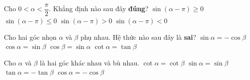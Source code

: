 \begin{ex}%
	 Cho $0< \alpha < \dfrac{\pi}{2}$. Khẳng định nào sau đây \textbf{đúng}?
	\choice 
		{$\sin \left(\alpha-\pi \right)\ge 0$} 
		{$\sin \left(\alpha-\pi \right)\le 0$} 
		{$\sin \left(\alpha-\pi  \right) > 0$}
		 {\True $\sin \left(\alpha-\pi \right) < 0$}
\end{ex}

\begin{ex}%
	Cho hai góc nhọn $\alpha$ và $\beta$ phụ nhau.  Hệ thức nào sau đây là \textbf{sai}?
	 \choice
		{\True $\sin \alpha=-\cos  \beta$}
		{$\cos \alpha=\sin \beta$} 
		{$\cos \beta=\sin  \alpha$}
		{$\cot  \alpha=\tan \beta$}
\end{ex}



\begin{ex}%
	Cho $\alpha $  và $\beta $ là hai góc khác nhau và bù nhau.
	 \choiceTF
		 {$\cot \alpha =\cot \beta $}
		{\True $\sin \alpha  =\sin \beta $}
		{\True $\tan \alpha =-\tan  \beta $}
		{\True $\cos  \alpha =-\cos \beta $}
\end{ex}

